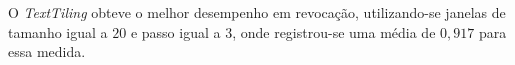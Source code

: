 O \textit{TextTiling} obteve o melhor desempenho em revocação, utilizando-se janelas de tamanho igual a $20$ e passo igual a $3$, onde registrou-se uma média de $0,917$ para essa medida.










% 
%





























%

